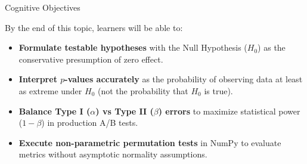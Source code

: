 \documentclass[../m00-session-03.tex]{subfiles}
\begin{document}

\begin{frame}{Cognitive Objectives}
  \begin{LearningObjectives}{By the end of this topic, learners will be able to:}
    \begin{itemize}\setlength{\itemsep}{0.28em}
      \item \textbf{Formulate testable hypotheses} with the Null Hypothesis ($H_0$) as the conservative presumption of zero effect.
      \item \textbf{Interpret $p$-values accurately} as the probability of observing data at least as extreme under $H_0$ (not the probability that $H_0$ is true).
      \item \textbf{Balance Type I ($\alpha$) vs Type II ($\beta$) errors} to maximize statistical power ($1-\beta$) in production A/B tests.
      \item \textbf{Execute non-parametric permutation tests} in NumPy to evaluate metrics without asymptotic normality assumptions.
    \end{itemize}
  \end{LearningObjectives}
\end{frame}
\end{document}
